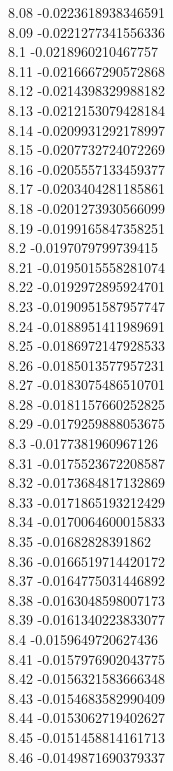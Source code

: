 {8.08	-0.0223618938346591\\
8.09	-0.0221277341556336\\
8.1	-0.0218960210467757\\
8.11	-0.0216667290572868\\
8.12	-0.0214398329988182\\
8.13	-0.0212153079428184\\
8.14	-0.0209931292178997\\
8.15	-0.0207732724072269\\
8.16	-0.0205557133459377\\
8.17	-0.0203404281185861\\
8.18	-0.0201273930566099\\
8.19	-0.0199165847358251\\
8.2	-0.0197079799739415\\
8.21	-0.0195015558281074\\
8.22	-0.0192972895924701\\
8.23	-0.0190951587957747\\
8.24	-0.0188951411989691\\
8.25	-0.0186972147928533\\
8.26	-0.0185013577957231\\
8.27	-0.0183075486510701\\
8.28	-0.0181157660252825\\
8.29	-0.0179259888053675\\
8.3	-0.0177381960967126\\
8.31	-0.0175523672208587\\
8.32	-0.0173684817132869\\
8.33	-0.0171865193212429\\
8.34	-0.0170064600015833\\
8.35	-0.01682828391862\\
8.36	-0.0166519714420172\\
8.37	-0.0164775031446892\\
8.38	-0.0163048598007173\\
8.39	-0.0161340223833077\\
8.4	-0.0159649720627436\\
8.41	-0.0157976902043775\\
8.42	-0.0156321583666348\\
8.43	-0.0154683582990409\\
8.44	-0.0153062719402627\\
8.45	-0.0151458814161713\\
8.46	-0.0149871690379337\\
}
